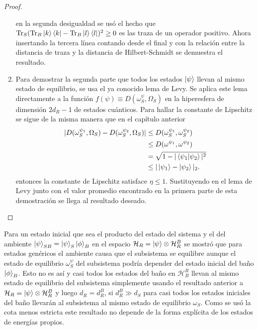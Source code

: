 \begin{proof}
\begin{enumerate}
en la segunda desigualdad se usó el hecho que $\Tr_{S} (\Tr_{B} \ket{k}\bra{k}-\Tr_{B} \ket{l}\bra{l})^{2}\geq 0$ es las traza de un operador positivo. Ahora insertando la tercera línea contando desde el final y con la relación entre la distancia de traza y la distancia de Hilbert-Schmidt se demuestra el resultado.
\item Para demostrar la segunda parte que todos los estados $\ket{\psi}$ llevan al mismo estado de equilibrio, se usa el ya conocido lema de Levy. Se aplica este lema directamente a la función $f(\psi) \equiv D(\omega_{S}^{\psi}, \Omega_{S})$ en la hiperesfera de dimensión $2d_{R}-1$ de estados cuánticos. Para hallar la constante de Lipschitz se sigue de la misma manera que en el capítulo anterior
\begin{align*}
|D(\omega_{S}^{\psi_{1}}, \Omega_{S})-D(\omega_{S}^{\psi_{2}},\Omega_{S})| &\leq D(\omega_{S}^{\psi_{1}},\omega_{S}^{\psi_{2}})
\\
&\leq D(\omega^{\psi_{1}},\omega^{\psi_{2}})
\\
&= \sqrt{1- |\bra{\psi_{1}} \ket{\psi_{2}}|^{2}}
\\
&\leq |\ket{\psi_{1}} - \ket{\psi_{2}}|_{2}.
\end{align*} 
entonces la constante de Lipschitz satisface $\eta \leq 1$. Sustituyendo en el lema de Levy junto con el valor promedio encontrado en la primera parte de esta demostración se llega al resultado deseado.
\\
\end{enumerate}
\end{proof}
Para un estado inicial que sea el producto del estado del sistema y el del ambiente $\ket{\psi}_{SB}= \ket{\psi}_{S} \ket{\phi}_{B}$ en el espacio $\mathcal{H}_{R}=\ket{\psi} \otimes \mathcal{H}_{R}^{B}$ se mostró que para estados genéricos el ambiente causa que el subsistema se equilibre aunque el estado de equilibrio $\omega_{S}^{\psi}$ del subsistema podría  depender del estado inicial del baño $\ket{\phi}_{B}$. Esto no es así y casi todos los estados del baño en $\mathcal{H}_{B}^{R}$ llevan al mismo estado de equilibrio del subsistema simplemente usando el resultado anterior a  $\mathcal{H}_{R} = \ket{\psi}\otimes \mathcal{H}_{R}^{B}$ y luego $d_{R} = d_{R}^{B}$, si $d_{R}^{B} \gg d_{S}$ para casi todos los estados iniciales del baño llevarán al subsistema al mismo estado de equilibrio $\omega_{S}$. Como se usó la cota menos estricta este resultado no depende de la forma explícita de los estados de energías propios.
\\


